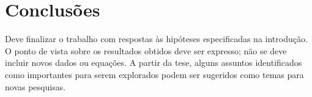 
\graphicspath{%
  {./Chapter-5/}%
}

\chapter{Conclusões}%
\label{chpt:concl}

Deve finalizar o trabalho com respostas às hipóteses especificadas na introdução.
O ponto de vista sobre os resultados obtidos deve ser expresso; não se deve incluir novos dados ou equações.
A partir da tese, alguns assuntos identificados como importantes para serem explorados podem ser sugeridos como temas para novas pesquisas.

